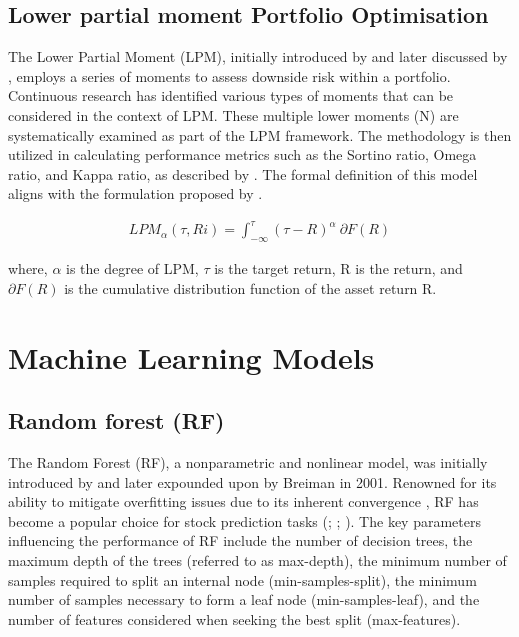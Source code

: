 \subsection{Lower partial moment Portfolio Optimisation}

The Lower Partial Moment (LPM), initially introduced by \cite{Nawrocki1992} and later discussed by \cite{Brogan2008}, employs a series of moments to assess downside risk within a portfolio. Continuous research has identified various types of moments that can be considered in the context of LPM. These multiple lower moments (N) are systematically examined as part of the LPM framework. The methodology is then utilized in calculating performance metrics such as the Sortino ratio, Omega ratio, and Kappa ratio, as described by \cite{Chen2016a}. The formal definition of this model aligns with the formulation proposed by \cite{Nawrocki1992}.

\[\begin{aligned} LPM_\alpha (\tau , Ri) = \int _{-\infty }^{\tau } (\tau - R)^\alpha ~\partial F(R) \end{aligned}\]

where, $\alpha$ is the degree of LPM, $\tau$ is the target return, R is the return, and $\partial F(R)$ is the cumulative distribution function of the asset return R.

\section{Machine Learning Models}

\subsection{Random forest (RF)}
The Random Forest (RF), a nonparametric and nonlinear model, was initially introduced by \cite{ho1995random} and later expounded upon by Breiman in 2001. Renowned for its ability to mitigate overfitting issues due to its inherent convergence \cite{breiman2001random}, RF has become a popular choice for stock prediction tasks (\cite{Ballings2015}; \cite{Booth2014}; \cite{qin2013linear}). The key parameters influencing the performance of RF include the number of decision trees, the maximum depth of the trees (referred to as max-depth), the minimum number of samples required to split an internal node (min-samples-split), the minimum number of samples necessary to form a leaf node (min-samples-leaf), and the number of features considered when seeking the best split (max-features).

